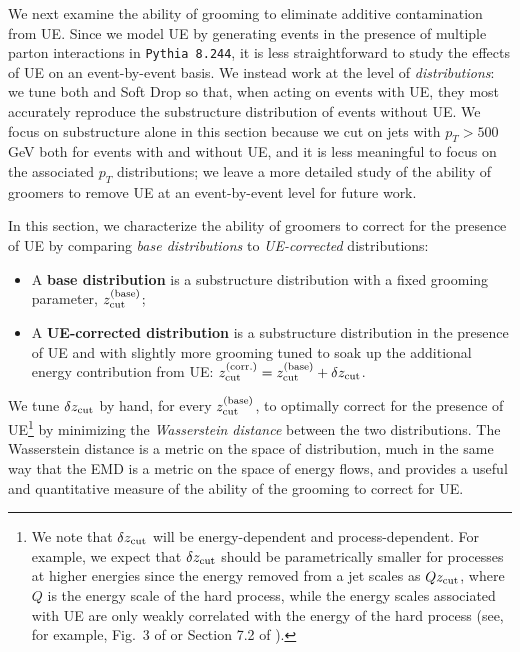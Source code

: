 We next examine the ability of grooming to eliminate additive contamination from UE.
%
Since we model UE by generating events in the presence of multiple parton interactions in \texttt{Pythia 8.244}, it is less straightforward to study the effects of UE on an event-by-event basis.
%
We instead work at the level of \textit{distributions}:
%
we tune both  and Soft Drop so that, when acting on events with UE, they most accurately reproduce the substructure distribution of events without UE.
%
We focus on substructure alone in this section because we cut on jets with \(p_T>500\) GeV both for events with and without UE, and it is less meaningful to focus on the associated \(p_T\) distributions;
%
we leave a more detailed study of the ability of \PIRANHA{} groomers to remove UE at an event-by-event level for future work.

In this section, we characterize the ability of groomers to correct for the presence of UE by comparing \textit{base distributions} to \textit{UE-corrected} distributions:
\begin{itemize}
    \item
    A \textbf{base distribution} is a substructure distribution with a fixed grooming parameter, \(z_{\rm cut}^{(\rm base)}\);

    \item
    A \textbf{UE-corrected distribution} is a substructure distribution in the presence of UE and with slightly more grooming tuned to soak up the additional energy contribution from UE:
    \(z_{\rm cut}^{(\rm corr.)} = z_{\rm cut}^{(\rm base)} + \delta z_{\rm cut}\).
\end{itemize}
We tune \(\delta z_{\rm cut}\) by hand, for every \(z_{\rm cut}^{(\rm base)}\), to optimally correct for the presence of UE\footnote{
We note that \(\delta z_{\rm cut}\) will be energy-dependent and process-dependent.
%
For example, we expect that \(\delta z_{\rm cut}\) should be parametrically smaller for processes at higher energies since the energy removed from a jet scales as \(Q z_{\rm cut}\), where \(Q\) is the energy scale of the hard process, while the energy scales associated with UE are only weakly correlated with the energy of the hard process (see, for example, Fig.~3 of  or Section 7.2 of ).
} by minimizing the \textit{Wasserstein distance} between the two distributions.
%
The Wasserstein distance is a metric on the space of distribution, much in the same way that the EMD is a metric on the space of energy flows, and provides a useful and quantitative measure of the ability of the grooming to correct for UE.




